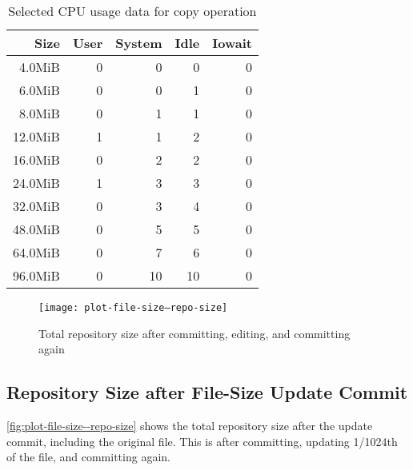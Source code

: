 \begin{table}[hp]
    \caption{Selected CPU usage data for copy operation}
    \label{copy-cpu-data}

    \centering
    \begin{tabular}{r r r r r}
        Size & User & System & Idle & Iowait \\
        \midrule
  4.0MiB &    0    &      0    &      0    &      0 \\
  6.0MiB &    0    &      0    &      1    &      0 \\
  8.0MiB &    0    &      1    &      1    &      0 \\
 12.0MiB &    1    &      1    &      2    &      0 \\
 16.0MiB &    0    &      2    &      2    &      0 \\
 24.0MiB &    1    &      3    &      3    &      0 \\
 32.0MiB &    0    &      3    &      4    &      0 \\
 48.0MiB &    0    &      5    &      5    &      0 \\
 64.0MiB &    0    &      7    &      6    &      0 \\
 96.0MiB &    0    &     10    &     10    &      0 \\
    \end{tabular}
\end{table}

%


\begin{figure}[p]
        \caption{Total repository size after committing, editing, and committing again}
        \label{fig:plot-file-size--repo-size}
        \centering

        \explaindiskspaceplot

        \texttt{[image: plot-file-size--repo-size]}
\end{figure}

\cleardoublepage

\subsection{Repository Size after File-Size Update Commit}

\autoref{fig:plot-file-size--repo-size} shows the total \gls{repository} size
after the update \gls{commit}, including the original file. This is after
committing, updating \num{1/1024}th of the file, and committing again.

